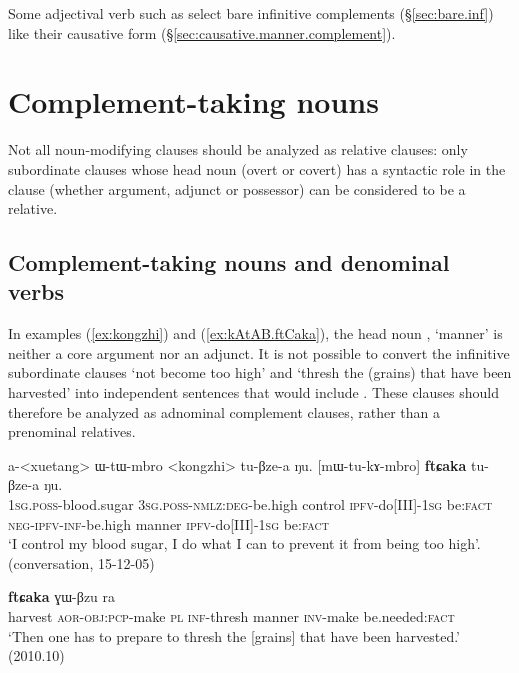 Some adjectival verb such as  select bare infinitive complements (§\ref{sec:bare.inf}) like their causative form (§\ref{sec:causative.manner.complement}).



  \section{Complement-taking nouns} \label{sec:complement.taking.nouns}
 Not all noun-modifying clauses should be analyzed as relative clauses: only subordinate clauses whose head noun (overt or covert) has a syntactic role in the clause (whether argument, adjunct or possessor) can be considered to be a relative.

\subsection{Complement-taking nouns and denominal verbs}  \label{sec:compl.taking.nouns.denominal}
In examples (\ref{ex:kongzhi}) and (\ref{ex:kAtAB.ftCaka}), the head noun , `manner' is neither a core argument nor an adjunct. It is not possible to convert the infinitive subordinate clauses  `not become too high' and  `thresh the (grains) that have been harvested' into independent sentences that would include . These clauses  should therefore be analyzed as adnominal complement clauses, rather than a prenominal relatives.
  
 \begin{exe}
\ex \label{ex:kongzhi}
\gll a-<xuetang> ɯ-tɯ-mbro <kongzhi> tu-βze-a ŋu. [mɯ-tu-kɤ-mbro] \textbf{ftɕaka} tu-βze-a ŋu. \\
  \textsc{1sg}.\textsc{poss}-blood.sugar \textsc{3sg}.\textsc{poss}-\textsc{nmlz}:\textsc{deg}-be.high control \textsc{ipfv}-do[III]-\textsc{1sg} be:\textsc{fact} \textsc{neg}-\textsc{ipfv}-\textsc{inf}-be.high manner \textsc{ipfv}-do[III]-\textsc{1sg} be:\textsc{fact} \\
\glt `I control my blood sugar, I do what I can to prevent it from being too high'. (conversation, 15-12-05)
\end{exe}
  
 \begin{exe}
\ex \label{ex:kAtAB.ftCaka}
 \textbf{ftɕaka} ɣɯ-βzu ra   \\
 harvest \textsc{aor}-\textsc{obj}:\textsc{pcp}-make \textsc{pl} \textsc{inf}-thresh manner \textsc{inv}-make be.needed:\textsc{fact} \\
 \glt `Then one has to prepare to thresh the [grains] that have been harvested.' (2010.10)
\end{exe}
 
